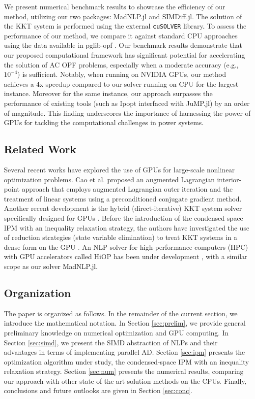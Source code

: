 We present numerical benchmark results to showcase the efficiency of
our method, utilizing our two packages: MadNLP.jl and
SIMDiff.jl. The solution of the KKT system is performed using the
external {\tt cuSOLVER} library. To assess the performance of our method, we
compare it against standard CPU approaches using the data available in
pglib-opf \cite{babaeinejadsarookolaee2019power}.  Our benchmark results
demonstrate that our proposed computational framework has significant
potential for accelerating the solution of AC OPF problems, especially
when a moderate accuracy (e.g., $10^{-4}$) is sufficient.
Notably, when running on NVIDIA GPUs, our method achieves a
4x speedup compared to our solver running on CPU for
the largest instance. Moreover for the same instance, our approach
surpasses the performance of existing tools (such as Ipopt interfaced
with JuMP.jl) by an order of magnitude. This finding underscores the
importance of harnessing the power of GPUs for tackling
the computational challenges in power systems.

\subsection{Related Work}
Several recent works have explored the use of GPUs for large-scale
nonlinear optimization problems. Cao et al. \cite{cao2016augmented}
proposed an augmented Lagrangian interior-point approach that employs
augmented Lagrangian outer iteration and the treatment of linear
systems using a preconditioned conjugate gradient method.  Another
recent development is the hybrid (direct-iterative) KKT system solver
specifically designed for GPUs \cite{regev2023hykkt}.  Before the
introduction of the condensed space IPM with an inequality relaxation
strategy, the authors have investigated the use of reduction
strategies (state variable elimination) to treat KKT systems in a
dense form on the GPU
\cite{pacaud2023parallel,pacaud2022feasible,pacaud2023accelerating,cole2023exploiting}.
An NLP solver for high-performance computers (HPC) with GPU
accelerators called HiOP has been under development
\cite{hiop_techrep}, with a similar scope as our solver
MadNLP.jl.

\subsection{Organization}
The paper is organized as follows. In the remainder of the current
section, we introduce the mathematical notation. In Section
\ref{sec:prelim}, we provide general preliminary knowledge on
numerical optimization and GPU computing. In Section \ref{sec:simd},
we present the SIMD abstraction of NLPs and their advantages in terms
of implementing parallel AD. Section \ref{sec:ipm} presents the
optimization algorithm under study, the condensed-space IPM with an
inequality relaxation strategy. Section \ref{sec:num} presents the
numerical results, comparing our approach with other state-of-the-art
solution methods on the CPUs. Finally, conclusions and future outlooks
are given in Section \ref{sec:conc}.


